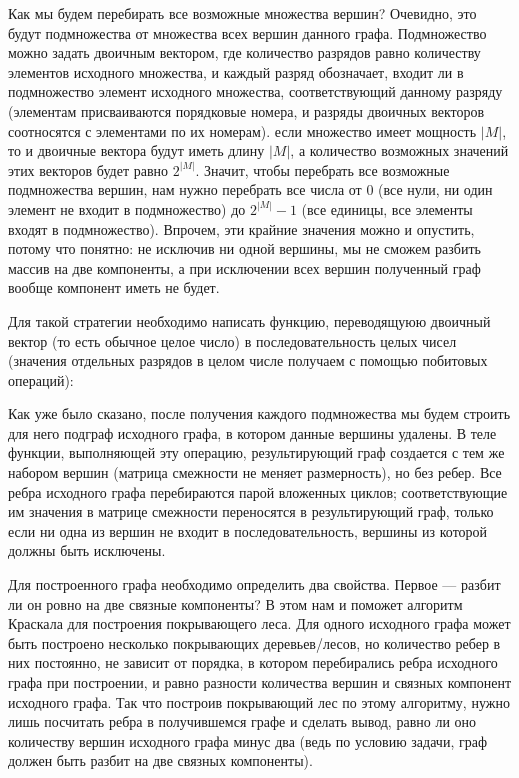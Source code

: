 \documentclass[12pt]{article}
\begin{document}
	 
	
	Как мы будем перебирать все возможные множества вершин? Очевидно, это будут подмножества от множества всех вершин данного графа. Подмножество можно задать двоичным вектором, где количество разрядов равно количеству элементов исходного множества, и каждый разряд обозначает, входит ли в подмножество элемент исходного множества, соответствующий данному разряду (элементам присваиваются порядковые номера, и разряды двоичных векторов соотносятся с элементами по их номерам). если множество имеет мощность $|M|$, то и двоичные вектора будут иметь длину $|M|$, а количество возможных значений этих векторов будет равно $2^{|M|}$. Значит, чтобы перебрать все возможные подмножества вершин, нам нужно перебрать все числа от 0 (все нули, ни один элемент не входит в подмножество) до $2^{|M|}-1$ (все единицы, все элементы входят в подмножество). Впрочем, эти крайние значения можно и опустить, потому что понятно: не исключив ни одной вершины, мы не сможем разбить массив на две компоненты, а при исключении всех вершин полученный граф вообще компонент иметь не будет. 
	
	Для такой стратегии необходимо написать функцию, переводящуюю двоичный вектор (то есть обычное целое число) в последовательность целых чисел (значения отдельных разрядов в целом числе получаем с помощью побитовых операций):
	
	 
	
	Как уже было сказано, после получения каждого подмножества мы будем строить для него подграф исходного графа, в котором данные вершины удалены. В теле функции, выполняющей эту операцию, результирующий граф создается с тем же набором вершин (матрица смежности не меняет размерность), но без ребер. Все ребра исходного графа перебираются парой вложенных циклов; соответствующие им значения в матрице смежности переносятся в результирующий граф, только если ни одна из вершин не входит в последовательность, вершины из которой должны быть исключены.
	
	 
	
	Для построенного графа необходимо определить два свойства. Первое --- разбит ли он ровно на две связные компоненты? В этом нам и поможет алгоритм Краскала для построения покрывающего леса. Для одного исходного графа может быть построено несколько покрывающих деревьев/лесов, но количество ребер в них постоянно, не зависит от порядка, в котором перебирались ребра исходного графа при построении, и равно разности количества вершин и связных компонент исходного графа. Так что построив покрывающий лес по этому алгоритму, нужно лишь посчитать ребра в получившемся графе и сделать вывод, равно ли оно количеству вершин исходного графа минус два (ведь по условию задачи, граф должен быть разбит на две связных компоненты).
	
\end{document}
